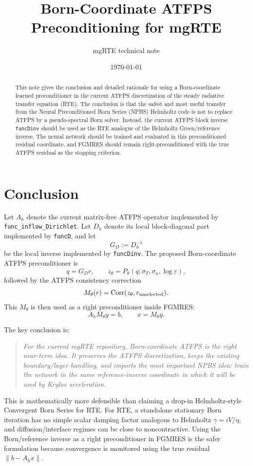 \documentclass[11pt]{article}
\title{Born-Coordinate ATFPS Preconditioning for mgRTE}
\author{mgRTE technical note}
\date{\today}
\newcommand{\norm}[1]{\left\lVert #1 \right\rVert}
\begin{document}
\maketitle

\begin{abstract}
This note gives the conclusion and detailed rationale for using a
Born-coordinate learned preconditioner in the current ATFPS discretization of
the steady radiative transfer equation (RTE).  The conclusion is that the
safest and most useful transfer from the Neural Preconditioned Born Series
(NPBS) Helmholtz code is not to replace ATFPS by a pseudo-spectral Born solver.
Instead, the current ATFPS block inverse \texttt{funcDinv} should be used as
the RTE analogue of the Helmholtz Green/reference inverse.  The neural network
should be trained and evaluated in this preconditioned residual coordinate, and
FGMRES should remain right-preconditioned with the true ATFPS residual as the
stopping criterion.
\end{abstract}

\section{Conclusion}

Let \(A_h\) denote the current matrix-free ATFPS operator implemented by
\texttt{func\_inflow\_Dirichlet}.  Let \(D_h\) denote its local block-diagonal
part implemented by \texttt{funcD}, and let
\[
  G_D := D_h^{-1}
\]
be the local inverse implemented by \texttt{funcDinv}.  The proposed
Born-coordinate ATFPS preconditioner is
\[
  q = G_D r,\qquad z_\theta = P_\theta(q;\sigma_T,\sigma_a,\log\varepsilon),
\]
followed by the ATFPS consistency correction
\[
  M_\theta(r) = \operatorname{Corr}(z_\theta,r_{\rm unselected}).
\]
This \(M_\theta\) is then used as a right preconditioner inside FGMRES:
\[
  A_h M_\theta y = b,\qquad x = M_\theta y.
\]

The key conclusion is:
\begin{quote}
\emph{For the current mgRTE repository, Born-coordinate ATFPS is the right
near-term idea.  It preserves the ATFPS discretization, keeps the existing
boundary/layer handling, and imports the most important NPBS idea: train the
network in the same reference-inverse coordinate in which it will be used by
Krylov acceleration.}
\end{quote}

This is mathematically more defensible than claiming a drop-in Helmholtz-style
Convergent Born Series for RTE.  For RTE, a standalone stationary Born iteration
has no simple scalar damping factor analogous to Helmholtz
\(\gamma=iV/\eta\), and diffusion/interface regimes can be close to
noncontractive.  Using the Born/reference inverse as a right preconditioner in
FGMRES is the safer formulation because convergence is monitored using the true
residual \(\norm{b-A_h x}\).
\end{document}
